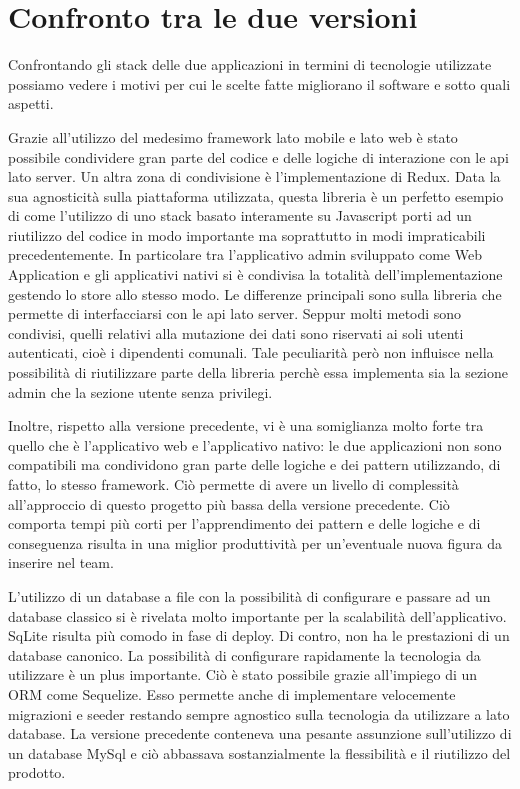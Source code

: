 \section{Confronto tra le due versioni}\vspace{5mm}  

Confrontando gli stack delle due applicazioni in termini di tecnologie utilizzate possiamo vedere i motivi per cui le scelte fatte migliorano il software e sotto quali aspetti. \vspace{5mm}

Grazie all'utilizzo del medesimo framework lato mobile e lato web è stato possibile condividere gran parte del codice e delle logiche di interazione con le api lato server. Un altra zona di condivisione è l'implementazione di Redux. Data la sua agnosticità sulla piattaforma utilizzata, questa libreria è un perfetto esempio di come l'utilizzo di uno stack basato interamente su Javascript porti ad un riutilizzo del codice in modo importante ma soprattutto in modi impraticabili precedentemente. In particolare tra l’applicativo admin sviluppato come Web Application e gli applicativi nativi si è condivisa la totalità dell’implementazione gestendo lo store allo stesso modo. Le differenze principali sono sulla libreria che permette di interfacciarsi con le api lato server. Seppur molti metodi sono condivisi, quelli relativi alla mutazione dei dati sono riservati ai soli utenti autenticati, cioè i dipendenti comunali. Tale peculiarità però non influisce nella possibilità di riutilizzare parte della libreria perchè essa implementa sia la sezione admin che la sezione utente senza privilegi.\vspace{5mm} 

Inoltre, rispetto alla versione precedente, vi è una somiglianza molto forte tra quello che è l’applicativo web e l’applicativo nativo: le due applicazioni non sono compatibili ma condividono gran parte delle logiche e dei pattern utilizzando, di fatto, lo stesso framework. Ciò permette di avere un livello di complessità all'approccio di questo progetto più bassa della versione precedente. Ciò comporta tempi più corti per l'apprendimento dei pattern e delle logiche e di conseguenza risulta in una miglior produttività per un'eventuale nuova figura da inserire nel team.\vspace{5mm}
	
L'utilizzo di un database a file con la possibilità di configurare e passare ad un database classico si è rivelata molto importante per la scalabilità dell’applicativo. SqLite risulta più comodo in fase di deploy. Di contro, non ha le prestazioni di un database canonico. La possibilità di configurare rapidamente la tecnologia da utilizzare è un plus importante. Ciò è stato possibile grazie all’impiego di un ORM come Sequelize\cite{Sequelize}. Esso permette anche di implementare velocemente migrazioni e seeder restando sempre agnostico sulla tecnologia da utilizzare a lato database. La versione precedente conteneva una pesante assunzione sull’utilizzo di un database MySql e ciò abbassava sostanzialmente la flessibilità e il riutilizzo del prodotto.\vspace{5mm}

